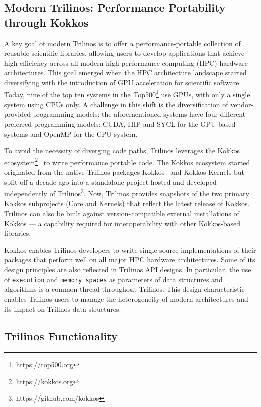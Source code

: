 \subsection{Modern Trilinos:  Performance Portability through Kokkos}


A key goal of modern Trilinos is to offer a performance\hyp{}portable collection of reusable scientific libraries, allowing users to develop applications that achieve high efficiency across all modern high performance computing (HPC) hardware architectures.
This goal emerged when the HPC architecture landscape started diversifying with the
introduction of GPU acceleration for scientific software. Today, nine of the top ten systems in the Top500\footnote{https://top500.org} use GPUs, with only a single system using CPUs only. A challenge in this shift is the diversification of vendor-provided programming models: the aforementioned systems have four different preferred programming models: CUDA, HIP and SYCL for the GPU-based systems and OpenMP for the CPU system.

To avoid the necessity of diverging code paths, Trilinos leverages the Kokkos ecosystem\footnote{\url{https://kokkos.org}}~\cite{trott2021kokkos} to write performance portable code. The Kokkos ecosystem started originated from the native Trilinos packages Kokkos~\cite{heroux2011toward} and Kokkos Kernels but split off a decade ago into a standalone project hosted and developed independently of Trilinos\footnote{https://github.com/kokkos}.
Now, Trilinos provides snapshots of the two primary Kokkos subprojects (Core and Kernels) that reflect the latest release of Kokkos. Trilinos can also be built against version-compatible external installations of Kokkos --- a capability required for interoperability with other Kokkos-based libraries.

Kokkos enables Trilinos developers to write single source implementations of their packages that perform well on all major HPC hardware architectures. Some of its design principles are also reflected in Trilinos API designs. In particular, the
use of \texttt{execution} and \texttt{memory spaces} as parameters of data structures and algorithms is a common thread throughout Trilinos. This design characteristic enables Trilinos users to manage the heterogeneity of modern architectures and its impact on Trilinos data structures.


\subsection{Trilinos Functionality}


